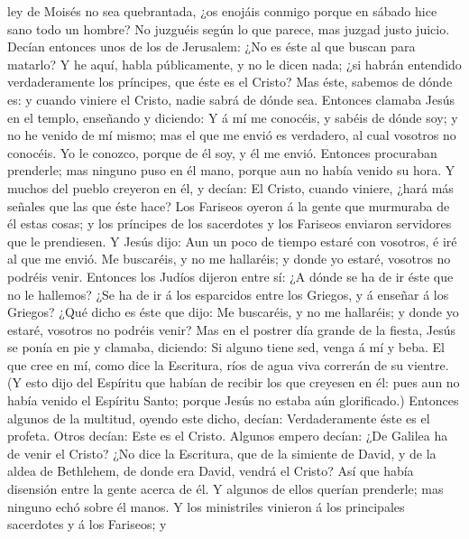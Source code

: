 ley de Moisés no sea quebrantada, ¿os enojáis conmigo porque en sábado
hice sano todo un hombre?  No juzguéis según lo que parece,
mas juzgad justo juicio.  Decían entonces unos de los de
Jerusalem: ¿No es éste al que buscan para matarlo?  Y he
aquí, habla públicamente, y no le dicen nada; ¿si habrán entendido
verdaderamente los príncipes, que éste es el Cristo?  Mas
éste, sabemos de dónde es: y cuando viniere el Cristo, nadie sabrá de
dónde sea.  Entonces clamaba Jesús en el templo, enseñando
y diciendo: Y á mí me conocéis, y sabéis de dónde soy; y no he venido de
mí mismo; mas el que me envió es verdadero, al cual vosotros no
conocéis.  Yo le conozco, porque de él soy, y él me envió.
 Entonces procuraban prenderle; mas ninguno puso en él
mano, porque aun no había venido su hora.  Y muchos del
pueblo creyeron en él, y decían: El Cristo, cuando viniere, ¿hará más
señales que las que éste hace?  Los Fariseos oyeron á la
gente que murmuraba de él estas cosas; y los príncipes de los sacerdotes
y los Fariseos enviaron servidores que le prendiesen.  Y
Jesús dijo: Aun un poco de tiempo estaré con vosotros, é iré al que me
envió.  Me buscaréis, y no me hallaréis; y donde yo estaré,
vosotros no podréis venir.  Entonces los Judíos dijeron
entre sí: ¿A dónde se ha de ir éste que no le hallemos? ¿Se ha de ir á
los esparcidos entre los Griegos, y á enseñar á los Griegos?
 ¿Qué dicho es éste que dijo: Me buscaréis, y no me
hallaréis; y donde yo estaré, vosotros no podréis venir? 
Mas en el postrer día grande de la fiesta, Jesús se ponía en pie y
clamaba, diciendo: Si alguno tiene sed, venga á mí y beba. 
El que cree en mí, como dice la Escritura, ríos de agua viva correrán de
su vientre.  (Y esto dijo del Espíritu que habían de
recibir los que creyesen en él: pues aun no había venido el Espíritu
Santo; porque Jesús no estaba aún glorificado.)  Entonces
algunos de la multitud, oyendo este dicho, decían: Verdaderamente éste
es el profeta.  Otros decían: Este es el Cristo. Algunos
empero decían: ¿De Galilea ha de venir el Cristo?  ¿No dice
la Escritura, que de la simiente de David, y de la aldea de Bethlehem,
de donde era David, vendrá el Cristo?  Así que había
disensión entre la gente acerca de él.  Y algunos de ellos
querían prenderle; mas ninguno echó sobre él manos.  Y los
ministriles vinieron á los principales sacerdotes y á los Fariseos; y
